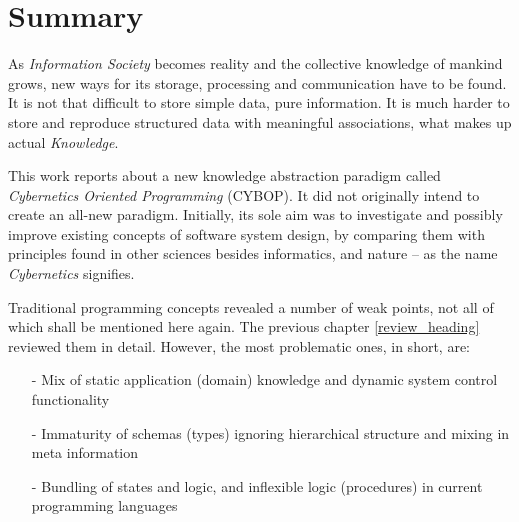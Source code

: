 %
%
%
%
%
%
%

\section{Summary}
\label{summary_heading}

As \emph{Information Society} becomes reality and the collective knowledge of
mankind grows, new ways for its storage, processing and communication have to
be found. It is not that difficult to store simple data, pure information. It
is much harder to store and reproduce structured data with meaningful
associations, what makes up actual \emph{Knowledge}.

This work reports about a new knowledge abstraction paradigm called
\emph{Cybernetics Oriented Programming} (CYBOP). It did not originally intend
to create an all-new paradigm. Initially, its sole aim was to investigate and
possibly improve existing concepts of software system design, by comparing them
with principles found in other sciences besides informatics, and nature -- as
the name \emph{Cybernetics} signifies.

Traditional programming concepts revealed a number of weak points, not all of
which shall be mentioned here again. The previous chapter \ref{review_heading}
reviewed them in detail. However, the most problematic ones, in short, are:

\begin{itemize}
    \item[-] Mix of static application (domain) knowledge and dynamic system
        control functionality
    \item[-] Immaturity of schemas (types) ignoring hierarchical structure and
        mixing in meta information
    \item[-] Bundling of states and logic, and inflexible logic (procedures) in
        current programming languages
\end{itemize}

